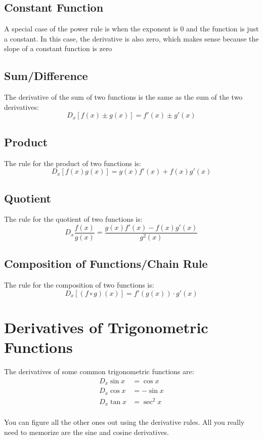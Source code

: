 \documentclass[fleqn]{exam}
\begin{document}
\subsection{Constant Function}
A special case of the power rule is when the exponent is 0 and the function is just a constant.  In this case, the derivative is also zero, which makes
sense because the slope of a constant function is zero

\subsection{Sum/Difference}
The derivative of the sum of two functions is the same as the sum of the two derivatives: 
\[
  D_x [ f(x) \pm g(x) ] = f'(x) \pm g'(x)
\]

\subsection{Product}
The rule for the product of two functions is:
\[
  D_x [ f(x) g(x) ] = g(x) f'(x) + f(x) g'(x)
\]

\subsection{Quotient}
The rule for the quotient of two functions is:
\[
  D_x \frac{f(x)}{g(x)} = \frac{g(x) f'(x) - f(x) g'(x)}{g^2(x)}
\]

\subsection{Composition of Functions/Chain Rule}
The rule for the composition of two functions is:
\[
  D_x [ (f \circ g) (x) ] = f'(g(x)) \cdot g'(x)
\]

\section{Derivatives of Trigonometric Functions}
The derivatives of some common trigonometric functions are:
\begin{align*}
  D_x \sin x &= \cos x \\
  D_x \cos x &= - \sin x \\
  D_x \tan x &= \sec^2 x \\
\end{align*}

You can figure all the other ones out using the derivative rules.  All you really need to memorize are the sine and
cosine derivatives.
\end{document}

